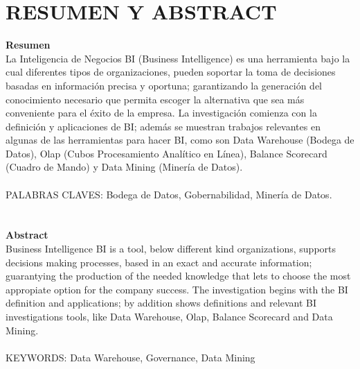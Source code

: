 \section{RESUMEN Y ABSTRACT} 
\begin{flushleft}
\textbf{Resumen}\\
La Inteligencia de Negocios BI (Business Intelligence) es una herramienta bajo
la cual diferentes tipos de organizaciones, pueden soportar la toma de decisiones
basadas en información precisa y oportuna; garantizando la generación del
conocimiento necesario que permita escoger la alternativa que sea más
conveniente para el éxito de la empresa. La investigación comienza con la
definición y aplicaciones de BI; además se muestran trabajos relevantes en
algunas de las herramientas para hacer BI, como son Data Warehouse (Bodega
de Datos), Olap (Cubos Procesamiento Analítico en Línea), Balance Scorecard
(Cuadro de Mando) y Data Mining (Minería de Datos).\textbf{}\\
\textbf{}\\
PALABRAS CLAVES: Bodega de Datos, Gobernabilidad, Minería de Datos.
\textbf{}\\
\textbf{}\\
\textbf{}\\
\textbf{Abstract}\\
Business Intelligence BI is a tool, below different kind organizations, supports
decisions making processes, based in an exact and accurate information;
guarantying the production of the needed knowledge that lets to choose the most
appropiate option for the company success. The investigation begins with the BI
definition and applications; by addition shows definitions and relevant BI
investigations tools, like Data Warehouse, Olap, Balance Scorecard and Data
Mining. \textbf{}\\ 
\textbf{}\\
KEYWORDS: Data Warehouse, Governance, Data Mining  


\textbf{}\\
\textbf{}\\
\textbf{}\\









\end{flushleft}